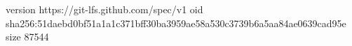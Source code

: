 version https://git-lfs.github.com/spec/v1
oid sha256:51daebd0bf51a1a1c371bff30ba3959ae58a530c3739b6a5aa84ae0639cad95e
size 87544
